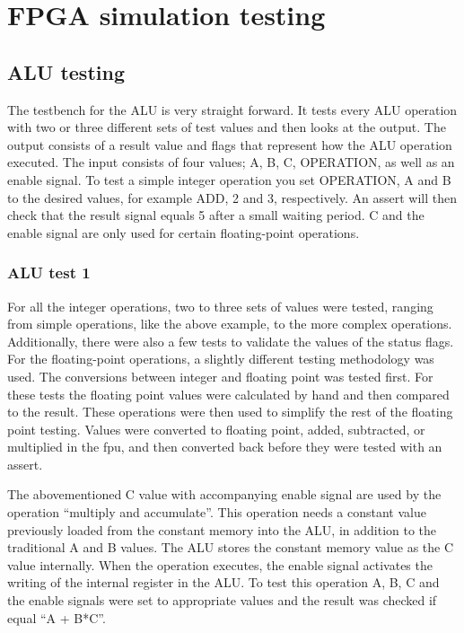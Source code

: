 \section{FPGA simulation testing}\label{section:fpga-simulation-testing}

\subsection{ALU testing}

The testbench for the ALU is very straight forward. It tests every ALU operation
with two or three different sets of test values and then looks at the output.
The output consists of a result value and flags that represent how the ALU
operation executed. The input consists of four values; A, B, C, OPERATION, as
well as an enable signal. To test a simple integer operation you set OPERATION,
A and B to the desired values, for example ADD, 2 and 3, respectively. An assert
will then check that the result signal equals 5 after a small waiting period. C
and the enable signal are only used for certain floating-point operations.

\subsubsection{ALU test 1}

For all the integer operations, two to three sets of values were tested, ranging
from simple operations, like the above example, to the more complex operations.
Additionally, there were also a few tests to validate the values of the status flags. For the floating-point
operations, a slightly different testing methodology was used. The conversions
between integer and floating point was tested first. For these tests the
floating point values were calculated by hand and then compared to the result.
These operations were then used to simplify the rest of the floating point
testing. Values were converted to floating point, added, subtracted, or
multiplied in the fpu, and then converted back before they were tested with an
assert.

The abovementioned C value with accompanying enable signal are used by the
operation ``multiply and accumulate''. This operation needs a constant value
previously loaded from the constant memory into the ALU, in addition to the
traditional A and B values. The ALU stores the constant memory value as the C
value internally. When the operation executes, the enable signal activates the
writing of the internal register in the ALU. To test this operation A, B, C and
the enable signals were set to appropriate values and the result was checked if
equal ``A + B*C''.

